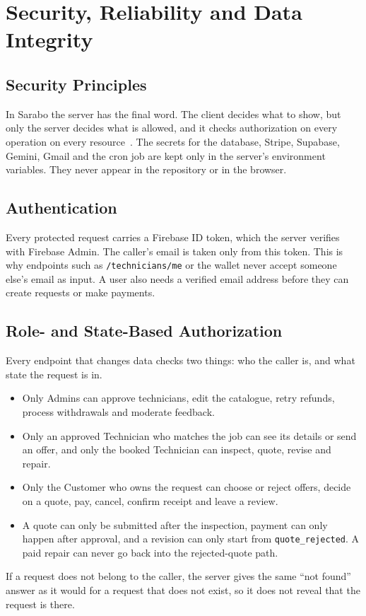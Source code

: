 \documentclass{standalone}
\begin{document}
\chapter{Security, Reliability and Data Integrity}

\section{Security Principles}
In Sarabo the server has the final word. The client decides what to show, but only the server decides what is allowed, and it checks authorization on every operation on every resource~\cite{owasprest}. The secrets for the database, Stripe, Supabase, Gemini, Gmail and the cron job are kept only in the server's environment variables. They never appear in the repository or in the browser.

\section{Authentication}
Every protected request carries a Firebase ID token, which the server verifies with Firebase Admin. The caller's email is taken only from this token. This is why endpoints such as \texttt{/technicians/me} or the wallet never accept someone else's email as input. A user also needs a verified email address before they can create requests or make payments.

\section{Role- and State-Based Authorization}
Every endpoint that changes data checks two things: who the caller is, and what state the request is in.
\begin{itemize}
  \item Only Admins can approve technicians, edit the catalogue, retry refunds, process withdrawals and moderate feedback.
  \item Only an approved Technician who matches the job can see its details or send an offer, and only the booked Technician can inspect, quote, revise and repair.
  \item Only the Customer who owns the request can choose or reject offers, decide on a quote, pay, cancel, confirm receipt and leave a review.
  \item A quote can only be submitted after the inspection, payment can only happen after approval, and a revision can only start from \texttt{quote\_rejected}. A paid repair can never go back into the rejected-quote path.
\end{itemize}
If a request does not belong to the caller, the server gives the same ``not found'' answer as it would for a request that does not exist, so it does not reveal that the request is there.
\end{document}
